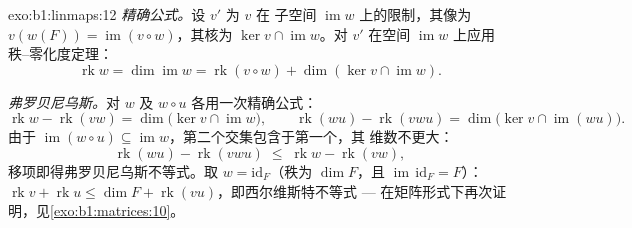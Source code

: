 \begin{solution}{exo:b1:linmaps:12}
\emph{精确公式。}设 $v'$ 为 $v$ 在
子空间 $\operatorname{im} w$ 上的限制，其像为 $v(w(F)) =
\operatorname{im}(v \circ w)$，其核为 $\ker v \cap
\operatorname{im} w$。对 $v'$ 在空间
$\operatorname{im} w$ 上应用秩--零化度定理：
\[
\operatorname{rk} w = \dim\operatorname{im} w
= \operatorname{rk}(v \circ w) + \dim(\ker v \cap
\operatorname{im} w) .
\]

\emph{弗罗贝尼乌斯。}对 $w$ 及
$w \circ u$ 各用一次精确公式：
\[
\operatorname{rk} w - \operatorname{rk}(vw)
= \dim\bigl(\ker v \cap \operatorname{im} w\bigr),
\qquad
\operatorname{rk}(wu) - \operatorname{rk}(vwu)
= \dim\bigl(\ker v \cap \operatorname{im}(wu)\bigr) .
\]
由于 $\operatorname{im}(w \circ u) \subseteq \operatorname{im}
w$，第二个交集包含于第一个，其
维数不更大：
\[
\operatorname{rk}(wu) - \operatorname{rk}(vwu)
\;\leq\; \operatorname{rk} w - \operatorname{rk}(vw) ,
\]
移项即得弗罗贝尼乌斯不等式。取 $w =
\mathrm{id}_F$（秩为 $\dim F$，且 $\operatorname{im}\,
\mathrm{id}_F = F$）：$\operatorname{rk} v + \operatorname{rk} u
\leq \dim F + \operatorname{rk}(vu)$，即西尔维斯特不等式 ---
在矩阵形式下再次证明，见\cref{exo:b1:matrices:10}。
\end{solution}

